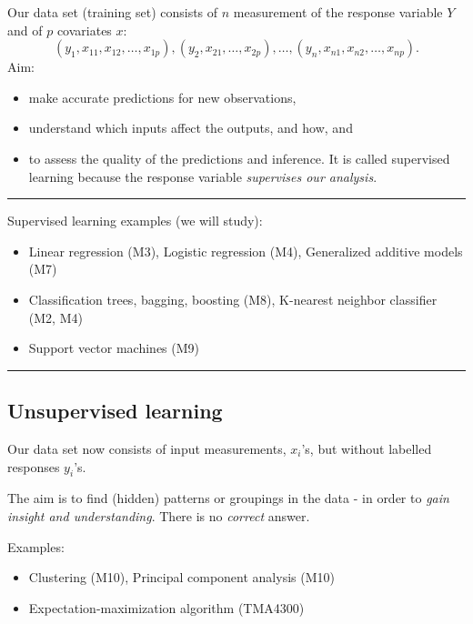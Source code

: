 \documentclass[]{article}
\providecommand{\tightlist}{%
  \setlength{\itemsep}{0pt}\setlength{\parskip}{0pt}}
\begin{document}
Our data set (training set) consists of \(n\) measurement of the
response variable \(Y\) and of \(p\) covariates \(x\):
\[(y_1, x_{11}, x_{12},\ldots, x_{1p}), (y_2, x_{21},\ldots, x_{2p}), \ldots, (y_n, x_{n1}, x_{n2},\ldots, x_{np}).\]
Aim:

\begin{itemize}
\tightlist
\item
  make accurate predictions for new observations,
\item
  understand which inputs affect the outputs, and how, and
\item
  to assess the quality of the predictions and inference. It is called
  supervised learning because the response variable \emph{supervises our
  analysis}.
\end{itemize}

\begin{center}\rule{0.5\linewidth}{\linethickness}\end{center}

Supervised learning examples (we will study):

\begin{itemize}
\tightlist
\item
  Linear regression (M3), Logistic regression (M4), Generalized additive
  models (M7)
\item
  Classification trees, bagging, boosting (M8), K-nearest neighbor
  classifier (M2, M4)
\item
  Support vector machines (M9)
\end{itemize}

\begin{center}\rule{0.5\linewidth}{\linethickness}\end{center}

\hypertarget{unsupervised-learning}{%
\subsection{Unsupervised learning}\label{unsupervised-learning}}

Our data set now consists of input measurements, \(x_i\)'s, but without
labelled responses \(y_i\)'s.

The aim is to find (hidden) patterns or groupings in the data - in order
to \emph{gain insight and understanding}. There is no \emph{correct}
answer.

Examples:

\begin{itemize}
\tightlist
\item
  Clustering (M10), Principal component analysis (M10)
\item
  Expectation-maximization algorithm (TMA4300)
\end{itemize}
\end{document}
